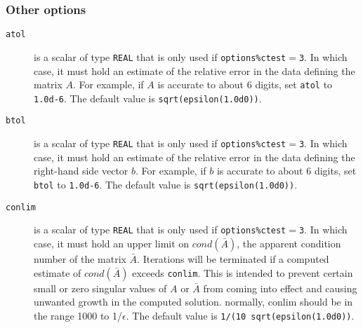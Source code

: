 \subsubsection*{Other options}

\begin{description}

\item[\texttt{atol}] is a scalar of type {\tt REAL} that is only used if
   {\tt options\%ctest}$ =${\tt 3}.
   In which case, it must hold an estimate of the relative error in the data
   defining the matrix $A$.  For example, if $A$ is accurate to about 6 digits,
   set {\tt atol} to {\tt 1.0d-6}. The default value is {\tt sqrt(epsilon(1.0d0))}.

\item[\texttt{btol}] is a scalar of type {\tt REAL} that is only used if
   {\tt options\%ctest}$ =${\tt 3}.
   In which case, it must hold an estimate of the relative error in the data
   defining the right-hand side vector $ b$.  For example, if $b$ is
   accurate to about 6 digits, set {\tt btol} to {\tt 1.0d-6}. The default value is 
   {\tt sqrt(epsilon(1.0d0))}.


\item[\texttt{conlim}] is a scalar of type {\tt REAL} that is only used if
   {\tt options\%ctest}$ =${\tt 3}.
   In which case, it must hold an upper limit on $cond(\bar{A})$, the apparent
   condition number of the matrix $\bar{A}$. Iterations will be terminated 
   if a computed estimate of $cond(\bar{A})$ exceeds {\tt conlim}.
   This is intended to prevent certain small or
   zero singular values of $A$ or $\bar{A}$ from
   coming into effect and causing unwanted growth in the computed solution.
   normally, conlim should be in the range 1000 to 1/$\epsilon$.
   The default value is {\tt 1/(10 sqrt(epsilon(1.0d0))}.


\end{description}
